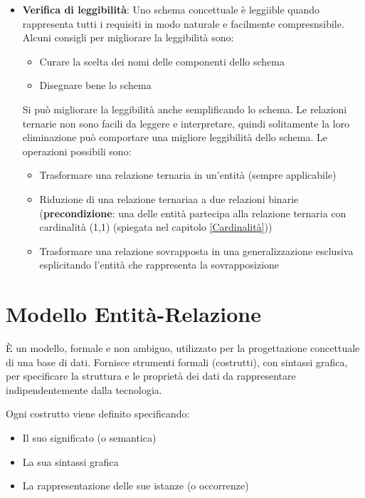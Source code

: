 \documentclass[a4paper]{article}
\begin{document}
\begin{itemize}
  \item \textbf{Verifica di leggibilità}: Uno schema concettuale è leggiible quando
    rappresenta tutti i requisiti in modo naturale e facilmente compresnsibile. Alcuni
    consigli per migliorare la leggibilità sono:
    \begin{itemize}
      \item Curare la scelta dei nomi delle componenti dello schema
      \item Disegnare bene lo schema
    \end{itemize}
    Si può migliorare la leggibilità anche semplificando lo schema. Le relazioni
    ternarie non sono facili da leggere e interpretare, quindi solitamente la loro
    eliminazione può comportare una migliore leggibilità dello schema.
    Le operazioni possibili sono:
    \begin{itemize}
      \item Trasformare una relazione ternaria in un'entità (sempre applicabile)
      \item Riduzione di una relazione ternariaa a due relazioni binarie\\
        (\textbf{precondizione}: una delle entità partecipa alla relazione ternaria
        con cardinalità (1,1) (spiegata nel capitolo \ref{Cardinalità})) 
      \item Trasformare una relazione sovrapposta in una generalizzazione esclusiva
        esplicitando l'entità che rappresenta la sovrapposizione
    \end{itemize}
\end{itemize}

\section{Modello Entità-Relazione}
È un modello, formale e non ambiguo, utilizzato per la progettazione concettuale di una
base di dati. Fornisce strumenti formali (costrutti), con sintassi grafica, per specificare la
struttura e le proprietà dei dati da rappresentare indipendentemente dalla tecnologia.

\vspace{1em}
\noindent
Ogni costrutto viene definito specificando:
\begin{itemize}
  \item Il suo significato (o semantica)
  \item La sua sintassi grafica
  \item La rappresentazione delle sue istanze (o occorrenze)
\end{itemize}
\end{document}
